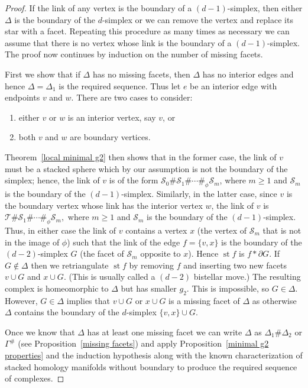 \documentclass[ALCO,ThmDefs,Unicode,epreuves]{cedram}
\DeclareMathOperator\st{st}
\newcommand{\T}{{\mathcal T}}
\newcommand{\Sm}{{\mathcal S}}
\begin{document}
\begin{proof}
 If the link of any vertex is the boundary of a $(d-1)$-simplex, then either $\Delta$ is the boundary of the $d$-simplex or we can remove the vertex and replace its star with a facet. Repeating this procedure as many times as necessary we can assume that there is no vertex whose link is the boundary of a $(d-1)$-simplex. The proof now continues by induction on the number of missing facets. 

First we show that if $\Delta$ has no missing facets, then $\Delta$ has no interior edges and hence $\Delta=\Delta_1$ is the required sequence. Thus let $e$ be an interior edge with endpoints $v$ and $w.$ There are two cases to consider: 
\begin{enumerate}
\item %
either $v$ or $w$ is an interior vertex, say $v$, or 
\item %
both $v$ and $w$ are boundary vertices. 
\end{enumerate}
\noindent
Theorem~\ref{local minimal g2} then shows that in the former case, the link of $v$ must be a stacked sphere which by our assumption is not the boundary of the simplex; hence, the link of $v$ is of the form $\Sm_0\#\Sm_1\#\cdots\#_{\phi}\Sm_m$, where $m\geq 1$ and $\Sm_m$ is the boundary of the $(d-1)$-simplex. Similarly, in the latter case, since $v$ is the boundary vertex whose link has the interior vertex $w$, the link of $v $ is $\T \# \Sm_1 \# \cdots \#_{\phi} \Sm_m,$ where $m\geq 1$ and $\Sm_m$ is the boundary of the $(d-1)$-simplex. Thus, in either case the link of $v$ contains a vertex $x$ (\eg the vertex of $\Sm_m$ that is not in the image of $\phi$) such that the link of the edge $f=\{v,x\}$ is the boundary of the $(d-2)$-simplex $G$ (the facet of $\Sm_m$ opposite to $x$). Hence $\st f$ is $f \ast \partial G.$ If $G \notin \Delta$ then we retriangulate $\st f$ by removing $f$ and inserting two new facets $v \cup G$ and $x \cup G.$ (This is usually called a $(d-2)$ bistellar move.) The resulting complex is homeomorphic to $\Delta$ but has smaller $g_2.$ This is impossible, so $G \in \Delta.$ However, $G\in\Delta$ implies that $v \cup G$ or $x \cup G$ is a missing facet of $\Delta$ as otherwise $\Delta$ contains the boundary of the $d$-simplex $\{v,x\} \cup G.$

Once we know that $\Delta$ has at least one missing facet we can write $\Delta$ as $\Delta_1 \# \Delta_2$ or $\Gamma^\#$ (see Proposition~\ref{missing facets}) and apply Proposition~\ref{minimal g2 properties} and the induction hypothesis along with the known characterization of stacked homology manifolds without boundary to produce the required sequence of complexes. 
 \end{proof}
 
\end{document}
